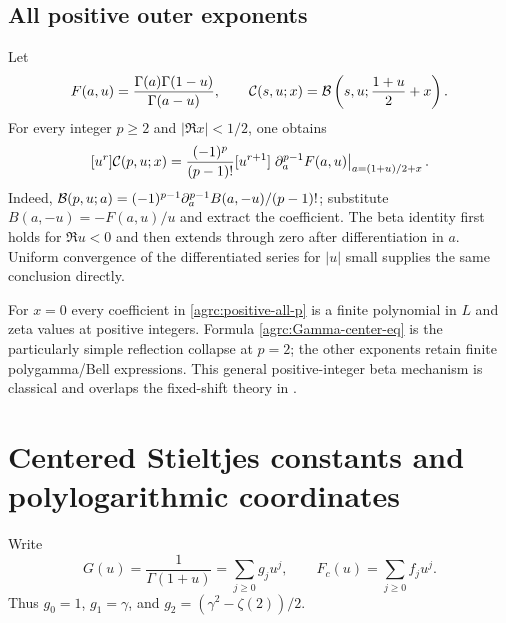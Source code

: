\subsection{All positive outer exponents}

Let
\[
 F(a,u)=\frac{\Gamma(a)\Gamma(1-u)}{\Gamma(a-u)},
 \qquad \mathcal C(s,u;x)=\mathcal B\left(s,u;\frac{1+u}{2}+x\right).
\]
For every integer $p\geq2$ and $|\Re x|<1/2$, one obtains
\begin{equation}\label{agrc:positive-all-p}
 [u^r]\mathcal C(p,u;x)=
 \frac{(-1)^p}{(p-1)!}[u^{r+1}]
  \left.\partial_a^{p-1}F(a,u)\right|_{a=(1+u)/2+x}.
\end{equation}
Indeed,
$\mathcal B(p,u;a)=(-1)^{p-1}\partial_a^{p-1}B(a,-u)/(p-1)!$;
substitute $B(a,-u)=-F(a,u)/u$ and extract the coefficient.
The beta identity first holds for $\Re u<0$ and then extends through
zero after differentiation in $a$. Uniform convergence of the differentiated
series for $|u|$ small supplies the same conclusion directly.

For $x=0$ every coefficient in \eqref{agrc:positive-all-p} is a finite
polynomial in $L$ and zeta values at positive integers. Formula
\eqref{agrc:Gamma-center-eq} is the particularly simple reflection
collapse at $p=2$; the other exponents retain finite polygamma/Bell
expressions. This general positive-integer beta mechanism is classical
and overlaps the fixed-shift theory in \cite{repo-laurent}.

\section{Centered Stieltjes constants and polylogarithmic coordinates}
\label{agrc:center-Stieltjes-section}

Write
\begin{equation}\label{agrc:Gf}
 G(u)=\frac1{\Gamma(1+u)}=\sum_{j\geq0}g_ju^j,
 \qquad F_c(u)=\sum_{j\geq0}f_ju^j.
\end{equation}
Thus $g_0=1$, $g_1=\gamma$, and
$g_2=(\gamma^2-\zeta(2))/2$.

